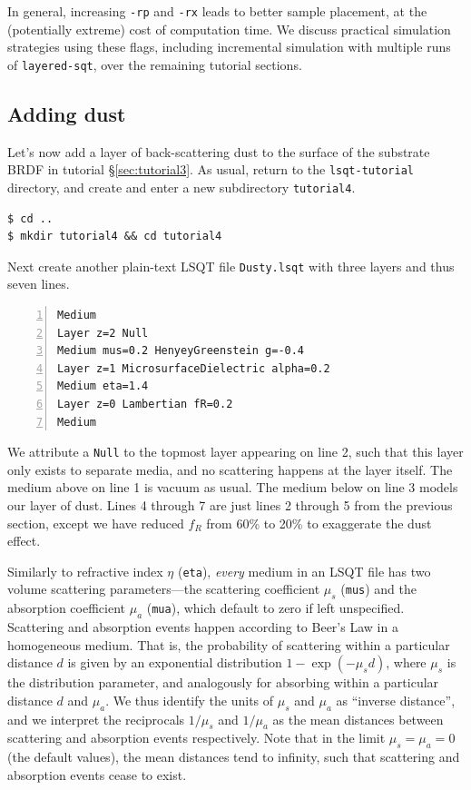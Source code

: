 \documentclass[
    twoside,
    twocolumn,
    letterpaper,
    10pt]{article}
\newcommand\namett[2]{{\color{code#1}\texttt{#2}}}
\begin{document}
In general, increasing \texttt{-rp} and \texttt{-rx} leads to better
sample placement, at the (potentially extreme) cost of computation time.
We discuss practical simulation strategies using these flags, including 
incremental simulation with multiple runs of \texttt{layered-sqt}, over
the remaining tutorial sections. 

\subsection{Adding dust}
\label{sec:tutorial4}

Let's now add a layer of back-scattering dust to the surface
of the substrate BRDF in tutorial \S\ref{sec:tutorial3}. As usual, return
to the \texttt{lsqt-tutorial} directory, and create and enter a new 
subdirectory \texttt{tutorial4}.
\begin{verbatim}
$ cd ..
$ mkdir tutorial4 && cd tutorial4
\end{verbatim}
Next create another plain-text LSQT file \texttt{Dusty.lsqt} with three 
layers and thus seven lines.
\begin{lstlisting}[numbers=left]
Medium
Layer z=2 Null
Medium mus=0.2 HenyeyGreenstein g=-0.4
Layer z=1 MicrosurfaceDielectric alpha=0.2
Medium eta=1.4
Layer z=0 Lambertian fR=0.2
Medium
\end{lstlisting}

We attribute a \namett{purple}{Null} to the topmost layer appearing
on line 2, such that this layer only exists to separate media, and 
no scattering happens at the layer itself. The medium above on line 1 
is vacuum as usual. The medium below on line 3 models our layer of dust.
Lines 4 through 7 are just lines 2 through 5 from the previous
section, except we have reduced $f_R$ from 60\% to 20\% to exaggerate
the dust effect.

Similarly to refractive index $\eta$ (\texttt{eta}), \emph{every} 
medium in an LSQT file has two volume scattering parameters---the 
scattering coefficient $\mu_s$ (\texttt{mus}) and the absorption 
coefficient $\mu_a$ (\texttt{mua}), which default to zero if 
left unspecified. Scattering and absorption events happen according
to Beer's Law in a homogeneous medium. That is, the probability of 
scattering within a particular distance $d$ is given by an exponential 
distribution $1 - \exp{(-\mu_s d)}$, where $\mu_s$ is the distribution 
parameter, and analogously for absorbing within a particular distance 
$d$ and $\mu_a$. We thus identify the units of $\mu_s$ and $\mu_a$ as 
``inverse distance'', and we interpret the reciprocals $1/\mu_s$ and 
$1/\mu_a$ as the mean distances between scattering and absorption events
respectively. Note that in the limit $\mu_s = \mu_a = 0$ (the default values),
the mean distances tend to infinity, such that scattering and absorption events
cease to exist.
\end{document}
